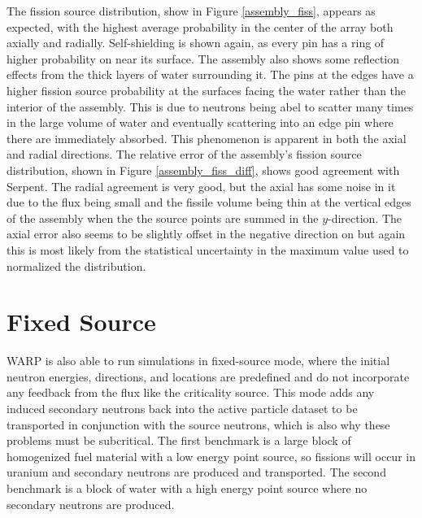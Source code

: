 The fission source distribution, show in Figure \ref{assembly_fiss}, appears as expected, with the highest average probability in the center of the array both axially and radially.  Self-shielding is shown again, as every pin has a ring of higher probability on near its surface.  The assembly also shows some reflection effects from the thick layers of water surrounding it.  The pins at the edges have a higher fission source probability at the surfaces facing the water rather than the interior of the assembly.  This is due to neutrons being abel to scatter many times in the large volume of water and eventually scattering into an edge pin where there are immediately absorbed.  This phenomenon is apparent in both the axial and radial directions.  The relative error of the assembly's fission source distribution, shown in Figure \ref{assembly_fiss_diff}, shows good agreement with Serpent.  The radial agreement is very good, but the axial has some noise in it due to the flux being small and the fissile volume being thin at the vertical edges of the assembly when the the source points are summed in the $y$-direction.  The axial error also seems to be slightly offset in the negative direction on but again this is most likely from the statistical uncertainty in the maximum value used to normalized the distribution.


\section{Fixed Source}

WARP is also able to run simulations in fixed-source mode, where the initial neutron energies, directions, and locations are predefined and do not incorporate any feedback from the flux like the criticality source.  This mode adds any induced secondary neutrons back into the active particle dataset to be transported in conjunction with the source neutrons, which is also why these problems must be subcritical.   The first benchmark is a large block of homogenized fuel material with a low energy point source, so fissions will occur in uranium and secondary neutrons are produced and transported.   The second benchmark is a block of water with a high energy point source where no secondary neutrons are produced.


